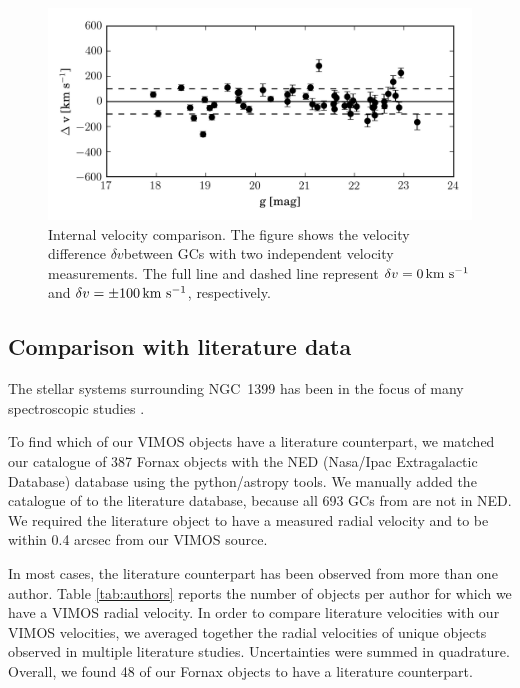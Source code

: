 \documentclass[useAMS,usenatbib]{mn2e}
\newcommand{\kms}{\mbox{\,km~s$^{-1}$}}
\begin{document}
\begin{figure}
\centering
\includegraphics[width=\columnwidth]{figures/internal.png} 
\caption{Internal velocity comparison. The figure shows the velocity difference $\delta v$between  GCs with two independent velocity measurements. The full line and dashed line represent $\delta v = 0 \kms$ and $\delta v = \pm 100 \kms$, respectively. }
\label{fig:internal}
\end{figure}

\subsection{Comparison with literature data}

The stellar systems surrounding NGC~1399 has been in the focus of many spectroscopic studies
\citep{Dirsch04, Schuberth10, Bergond07, Firth07, Chilingarian11, Mieske04, Hilker07, Francis12, Drinkwater00}.

To find which of our VIMOS objects have a literature counterpart, we matched our catalogue of 387 Fornax objects with the NED (Nasa/Ipac Extragalactic Database) database using the python/astropy tools. 
We manually added the catalogue of \citet{Schuberth} to the literature database, because all 693 GCs from \citep{Schuberth} are not in NED. We required the literature object to have a measured radial velocity and to be within 0.4 arcsec from our VIMOS source. 

In most cases, the literature counterpart has been observed from more than one author. Table \ref{tab:authors} reports the number of objects per author for which we have a VIMOS radial velocity. 
In order to compare literature velocities with our VIMOS velocities, we averaged together the radial velocities of unique objects observed in multiple literature studies. Uncertainties were summed in quadrature. Overall, we found 48 of our Fornax objects to have a literature counterpart. 
\end{document}
